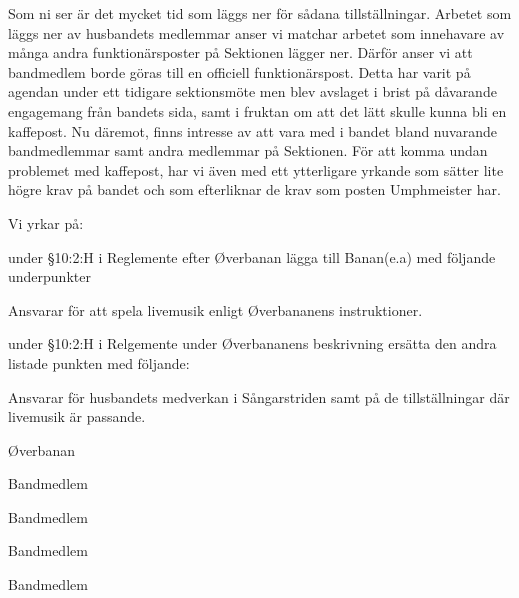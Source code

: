 \documentclass[../_main/handlingar.tex]{subfiles}
\begin{document}
Som ni ser är det mycket tid som läggs ner för sådana tillställningar. Arbetet som läggs ner av husbandets medlemmar anser vi matchar arbetet som innehavare av många andra funktionärsposter på Sektionen lägger ner. Därför anser vi att bandmedlem borde göras till en officiell funktionärspost. 
Detta har varit på agendan under ett tidigare sektionsmöte men blev avslaget i brist på dåvarande engagemang från bandets sida, samt i fruktan om att det lätt skulle kunna bli en kaffepost. Nu däremot, finns intresse av att vara med i bandet bland nuvarande bandmedlemmar samt andra medlemmar på Sektionen. För att komma undan problemet med kaffepost, har vi även med ett ytterligare yrkande som sätter lite högre krav på bandet och som efterliknar de krav som posten Umphmeister har.
\newpage

Vi yrkar på:
\begin{attsatser}
    \att under \S10:2:H i Reglemente efter Øverbanan lägga till Banan(e.a) med följande underpunkter
    \begin{itemizedash}
            \item Ansvarar för att spela livemusik enligt Øverbananens instruktioner.
    \end{itemizedash}  
    \att under \S10:2:H i Relgemente under Øverbananens beskrivning ersätta den andra listade punkten med följande:
    \begin{itemizedash}
            \item Ansvarar för husbandets medverkan i Sångarstriden samt på de tillställningar där livemusik är passande.
    \end{itemizedash}
\end{attsatser}

\begin{signatures}{5}
	\mvh
	\signature{William Sjödin}{Øverbanan}
	\signature{Daniel Bakic}{Bandmedlem}
    \signature{Oskar Magnusson}{Bandmedlem}
    \signature{Valter Möller}{Bandmedlem}
    \signature{Lukas Elmlund}{Bandmedlem}
\end{signatures}
\end{document}
